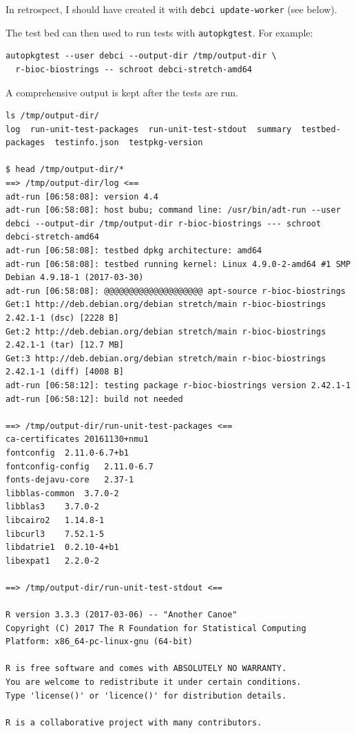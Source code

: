 \documentclass[mingoth,a4paper]{jsarticle}
\begin{document}
{{In retrospect, I should have created it with
\texttt{debci\ update-worker} (see below).

The test bed can then used to run tests with \texttt{autopkgtest}. For
example:

\begin{verbatim}
autopkgtest --user debci --output-dir /tmp/output-dir \
  r-bioc-biostrings -- schroot debci-stretch-amd64
\end{verbatim}

A comprehensive output is kept after the tests are run.

\begin{verbatim}
ls /tmp/output-dir/
log  run-unit-test-packages  run-unit-test-stdout  summary  testbed-packages  testinfo.json  testpkg-version

$ head /tmp/output-dir/*
==> /tmp/output-dir/log <==
adt-run [06:58:08]: version 4.4
adt-run [06:58:08]: host bubu; command line: /usr/bin/adt-run --user debci --output-dir /tmp/output-dir r-bioc-biostrings --- schroot debci-stretch-amd64
adt-run [06:58:08]: testbed dpkg architecture: amd64
adt-run [06:58:08]: testbed running kernel: Linux 4.9.0-2-amd64 #1 SMP Debian 4.9.18-1 (2017-03-30)
adt-run [06:58:08]: @@@@@@@@@@@@@@@@@@@@ apt-source r-bioc-biostrings
Get:1 http://deb.debian.org/debian stretch/main r-bioc-biostrings 2.42.1-1 (dsc) [2228 B]
Get:2 http://deb.debian.org/debian stretch/main r-bioc-biostrings 2.42.1-1 (tar) [12.7 MB]
Get:3 http://deb.debian.org/debian stretch/main r-bioc-biostrings 2.42.1-1 (diff) [4008 B]
adt-run [06:58:12]: testing package r-bioc-biostrings version 2.42.1-1
adt-run [06:58:12]: build not needed

==> /tmp/output-dir/run-unit-test-packages <==
ca-certificates 20161130+nmu1
fontconfig  2.11.0-6.7+b1
fontconfig-config   2.11.0-6.7
fonts-dejavu-core   2.37-1
libblas-common  3.7.0-2
libblas3    3.7.0-2
libcairo2   1.14.8-1
libcurl3    7.52.1-5
libdatrie1  0.2.10-4+b1
libexpat1   2.2.0-2

==> /tmp/output-dir/run-unit-test-stdout <==

R version 3.3.3 (2017-03-06) -- "Another Canoe"
Copyright (C) 2017 The R Foundation for Statistical Computing
Platform: x86_64-pc-linux-gnu (64-bit)

R is free software and comes with ABSOLUTELY NO WARRANTY.
You are welcome to redistribute it under certain conditions.
Type 'license()' or 'licence()' for distribution details.

R is a collaborative project with many contributors.


\end{verbatim}}}
\end{document}
